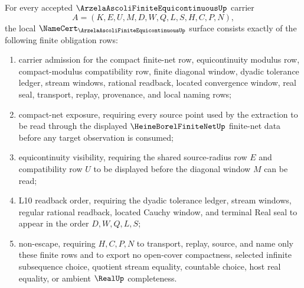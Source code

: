 \begin{theorem}
\label{thm:arzela-ascoli-finite-equicontinuous-obligations}
For every accepted $\ArzelaAscoliFiniteEquicontinuousUp$ carrier
$$
A=(K,E,U,M,D,W,Q,L,S,H,C,P,N),
$$
the local $\NameCert_{\ArzelaAscoliFiniteEquicontinuousUp}$ surface consists exactly of the following finite obligation rows:
\begin{enumerate}
\item carrier admission for the compact finite-net row, equicontinuity modulus row, compact-modulus compatibility row, finite diagonal window, dyadic tolerance ledger, stream windows, rational readback, located convergence window, real seal, transport, replay, provenance, and local naming rows;
\item compact-net exposure, requiring every source point used by the extraction to be read through the displayed $\HeineBorelFiniteNetUp$ finite-net data before any target observation is consumed;
\item equicontinuity visibility, requiring the shared source-radius row $E$ and compatibility row $U$ to be displayed before the diagonal window $M$ can be read;
\item L10 readback order, requiring the dyadic tolerance ledger, stream windows, regular rational readback, located Cauchy window, and terminal Real seal to appear in the order $D,W,Q,L,S$;
\item non-escape, requiring $H,C,P,N$ to transport, replay, source, and name only these finite rows and to export no open-cover compactness, selected infinite subsequence choice, quotient stream equality, countable choice, host real equality, or ambient $\RealUp$ completeness.
\end{enumerate}
\end{theorem}
